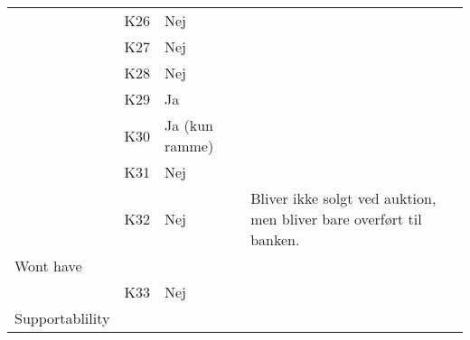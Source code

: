 \documentclass[class=article, crop=false]{standalone}
\begin{document}
\begin{table}[]
\begin{tabular}{llll}
            & K26      & Nej                &                                                                                                                                                                                                    \\
            & K27      & Nej                &                                                                                                                                                                                                    \\
            & K28      & Nej                &                                                                                                                                                                                                    \\
            & K29      & Ja                 &                                                                                                                                                                                                    \\
            & K30      & Ja (kun ramme)     &                                                                                                                                                                                                    \\
            & K31      & Nej                &                                                                                                                                                                                                    \\
            & K32      & Nej                & Bliver ikke solgt ved auktion, men bliver bare overført til banken.                                                                                                                                \\
            Wont have       &          &                    &                                                                                                                                                                                                    \\
            & K33      & Nej                &                                                                                                                                                                                                    \\
            Supportablility &          &                    &                                                                                                                                                                                                    \\

\end{tabular}
\end{table}
\end{document}
